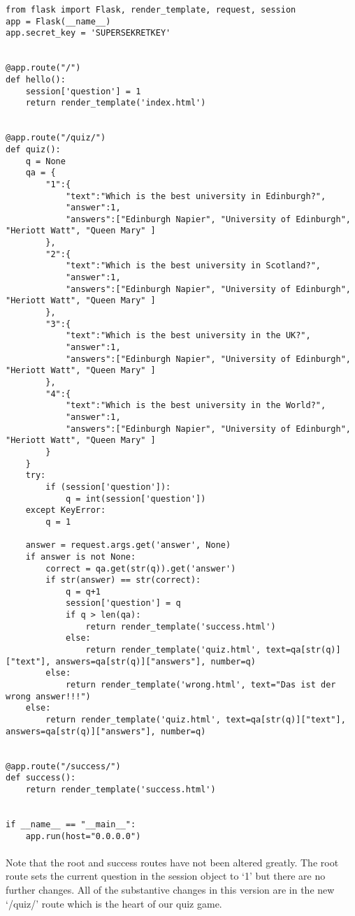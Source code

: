 \begin{lstlisting}
from flask import Flask, render_template, request, session
app = Flask(__name__)
app.secret_key = 'SUPERSEKRETKEY'


@app.route("/")
def hello():
    session['question'] = 1
    return render_template('index.html')


@app.route("/quiz/")
def quiz():
    q = None
    qa = {
        "1":{
            "text":"Which is the best university in Edinburgh?",
            "answer":1,
            "answers":["Edinburgh Napier", "University of Edinburgh", "Heriott Watt", "Queen Mary" ]
        },
        "2":{
            "text":"Which is the best university in Scotland?",
            "answer":1,
            "answers":["Edinburgh Napier", "University of Edinburgh", "Heriott Watt", "Queen Mary" ]
        },
        "3":{
            "text":"Which is the best university in the UK?",
            "answer":1,
            "answers":["Edinburgh Napier", "University of Edinburgh", "Heriott Watt", "Queen Mary" ]
        },
        "4":{
            "text":"Which is the best university in the World?",
            "answer":1,
            "answers":["Edinburgh Napier", "University of Edinburgh", "Heriott Watt", "Queen Mary" ]
        }
    }
    try:
        if (session['question']):
            q = int(session['question'])
    except KeyError:
        q = 1

    answer = request.args.get('answer', None)
    if answer is not None:
        correct = qa.get(str(q)).get('answer')
        if str(answer) == str(correct):
            q = q+1
            session['question'] = q
            if q > len(qa):
                return render_template('success.html')
            else:
                return render_template('quiz.html', text=qa[str(q)]["text"], answers=qa[str(q)]["answers"], number=q)
        else:
            return render_template('wrong.html', text="Das ist der wrong answer!!!")
    else:
        return render_template('quiz.html', text=qa[str(q)]["text"], answers=qa[str(q)]["answers"], number=q)


@app.route("/success/")
def success():
    return render_template('success.html')
    

if __name__ == "__main__":
    app.run(host="0.0.0.0")
\end{lstlisting}

\paragraph{} Note that the root and success routes have not been altered greatly. The root route sets the current question in the session object to `1' but there are no further changes. All of the substantive changes in this version are in the new `/quiz/' route which is the heart of our quiz game.

